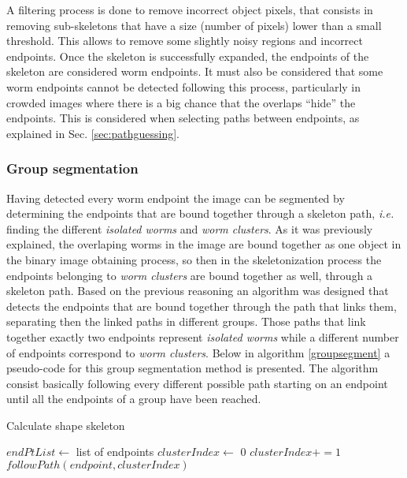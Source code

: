 A filtering process is done to remove incorrect object pixels, that consists in
removing sub-skeletons that have a size (number of pixels) lower than a small 
threshold. This allows to remove some slightly noisy regions and incorrect endpoints.
Once the skeleton is successfully expanded, the endpoints of the skeleton are considered
worm endpoints. 
It must also be considered that some worm endpoints cannot be detected following this 
process, particularly in crowded images where there is a big chance that the
overlaps ``hide'' the endpoints. This is considered when selecting paths between 
endpoints, as explained in Sec. \ref{sec:pathguessing}.



\subsubsection*{Group segmentation}

Having detected every worm endpoint the image can be segmented by determining
the endpoints that are bound together through a skeleton path, \emph{i.e.} finding 
the different \emph{isolated worms} and \emph{worm clusters}.
As it was previously explained, the overlaping worms in the image are bound together
as one object in the binary image obtaining process, so then in the skeletonization
process the endpoints belonging to \emph{worm clusters} are bound together as well,
through a skeleton path.
Based on the previous reasoning an algorithm was designed that detects the endpoints 
that are bound together through the path that links them, separating then the 
linked paths in different groups. Those paths that link together exactly two
endpoints represent \emph{isolated worms} while a different number of endpoints
correspond to \emph{worm clusters}.
Below in algorithm \ref{groupsegment} a pseudo-code for this group segmentation 
method is presented. The algorithm consist basically following every different
possible path starting on an endpoint until all the endpoints of a group have been 
reached. 

\begin{algorithm}                     
\caption{Calculate shape skeleton}         
\label{groupsegment}                    
\begin{algorithmic}                   

\STATE $endPtList \leftarrow$ list of endpoints
\STATE $clusterIndex \leftarrow$ 0
\STATE {}
\ELSE
\STATE $clusterIndex +=1$
\STATE $followPath(endpoint,clusterIndex)$
\ENDIF
\ENDFOR
\end{algorithmic}
\end{algorithm}

